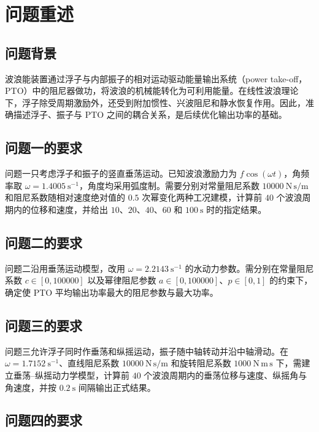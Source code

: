 \documentclass[withoutpreface]{../../../templates/CUMCM2026-Complete-LaTeX/cumcmthesis}
\begin{document}
\section{问题重述}

\subsection{问题背景}

波浪能装置通过浮子与内部振子的相对运动驱动能量输出系统（power take-off，PTO）中的阻尼器做功，将波浪的机械能转化为可利用能量。在线性波浪理论下，浮子除受周期激励外，还受到附加惯性、兴波阻尼和静水恢复作用\cite{falnes2002,cummins1962}。因此，准确描述浮子、振子与 PTO 之间的耦合关系，是后续优化输出功率的基础。

\subsection{问题一的要求}

问题一只考虑浮子和振子的竖直垂荡运动。已知波浪激励力为 $f\cos(\omega t)$，角频率取 $\omega=1.4005\ \mathrm{s^{-1}}$，角度均采用弧度制。需要分别对常量阻尼系数 $10000\ \mathrm{N\,s/m}$ 和阻尼系数随相对速度绝对值的 $0.5$ 次幂变化两种工况建模，计算前 $40$ 个波浪周期内的位移和速度，并给出 $10$、$20$、$40$、$60$ 和 $100\ \mathrm{s}$ 时的指定结果。

\subsection{问题二的要求}

问题二沿用垂荡运动模型，改用 $\omega=2.2143\ \mathrm{s^{-1}}$ 的水动力参数。需分别在常量阻尼系数 $c\in[0,100000]$ 以及幂律阻尼参数 $a\in[0,100000]$、$p\in[0,1]$ 的约束下，确定使 PTO 平均输出功率最大的阻尼参数与最大功率。

\subsection{问题三的要求}

问题三允许浮子同时作垂荡和纵摇运动，振子随中轴转动并沿中轴滑动。在 $\omega=1.7152\ \mathrm{s^{-1}}$、直线阻尼系数 $10000\ \mathrm{N\,s/m}$ 和旋转阻尼系数 $1000\ \mathrm{N\,m\,s}$ 下，需建立垂荡--纵摇动力学模型，计算前 $40$ 个波浪周期内的垂荡位移与速度、纵摇角与角速度，并按 $0.2\ \mathrm{s}$ 间隔输出正式结果。

\subsection{问题四的要求}
\end{document}
